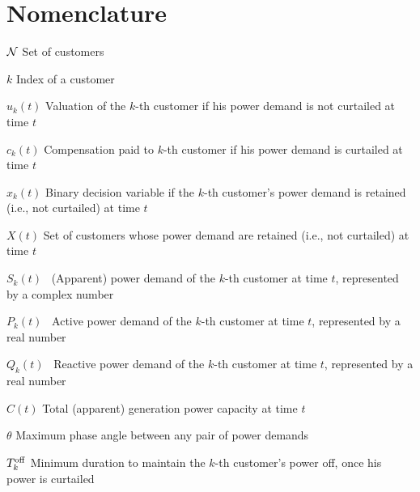 \vspace{-5pt}
\section*{Nomenclature}
\begin{IEEEdescription}
\item[${\cal N}$] Set of customers
\item[$k$] Index of a customer
\item[$u_k(t)$] Valuation of the $k$-th customer if his power demand is not curtailed at time $t$
\item[$c_k(t)$] Compensation paid to $k$-th customer if his power demand is curtailed at time $t$
\item[$x_k(t)$] Binary decision variable if the $k$-th customer's power demand is retained (i.e., not curtailed) at time $t$
\item[$X(t)$] Set of customers whose power demand are retained (i.e., not curtailed) at time $t$
\item[$S_k(t)$] \ (Apparent) power demand of the $k$-th customer at time $t$, represented by a complex number
\item[$P_k(t)$] \ Active power demand of the $k$-th customer at time $t$, represented by a real number
\item[$Q_k(t)$] \ Reactive power demand of the $k$-th customer at time $t$, represented by a real number
\item[$C(t)$] Total (apparent) generation power capacity at time $t$
\item[$\theta$] Maximum phase angle between any pair of power demands
\item[$T^{\rm off}_k$] Minimum duration to maintain the $k$-th customer's power off, once his power is curtailed
\end{IEEEdescription}
